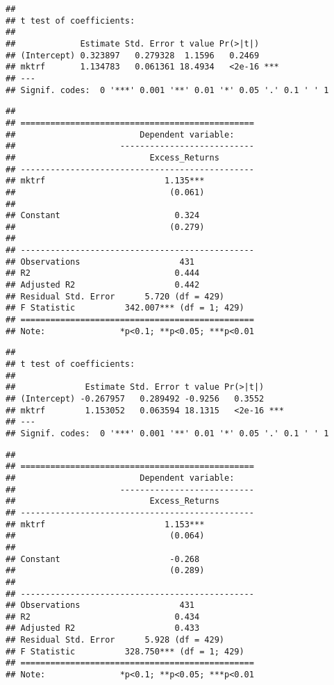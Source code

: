 \documentclass[
]{article}
\begin{document}
\begin{verbatim}
## 
## t test of coefficients:
## 
##             Estimate Std. Error t value Pr(>|t|)    
## (Intercept) 0.323897   0.279328  1.1596   0.2469    
## mktrf       1.134783   0.061361 18.4934   <2e-16 ***
## ---
## Signif. codes:  0 '***' 0.001 '**' 0.01 '*' 0.05 '.' 0.1 ' ' 1
\end{verbatim}

\begin{verbatim}
## 
## ===============================================
##                         Dependent variable:    
##                     ---------------------------
##                           Excess_Returns       
## -----------------------------------------------
## mktrf                        1.135***          
##                               (0.061)          
##                                                
## Constant                       0.324           
##                               (0.279)          
##                                                
## -----------------------------------------------
## Observations                    431            
## R2                             0.444           
## Adjusted R2                    0.442           
## Residual Std. Error      5.720 (df = 429)      
## F Statistic          342.007*** (df = 1; 429)  
## ===============================================
## Note:               *p<0.1; **p<0.05; ***p<0.01
\end{verbatim}

\begin{verbatim}
## 
## t test of coefficients:
## 
##              Estimate Std. Error t value Pr(>|t|)    
## (Intercept) -0.267957   0.289492 -0.9256   0.3552    
## mktrf        1.153052   0.063594 18.1315   <2e-16 ***
## ---
## Signif. codes:  0 '***' 0.001 '**' 0.01 '*' 0.05 '.' 0.1 ' ' 1
\end{verbatim}

\begin{verbatim}
## 
## ===============================================
##                         Dependent variable:    
##                     ---------------------------
##                           Excess_Returns       
## -----------------------------------------------
## mktrf                        1.153***          
##                               (0.064)          
##                                                
## Constant                      -0.268           
##                               (0.289)          
##                                                
## -----------------------------------------------
## Observations                    431            
## R2                             0.434           
## Adjusted R2                    0.433           
## Residual Std. Error      5.928 (df = 429)      
## F Statistic          328.750*** (df = 1; 429)  
## ===============================================
## Note:               *p<0.1; **p<0.05; ***p<0.01
\end{verbatim}
\end{document}
